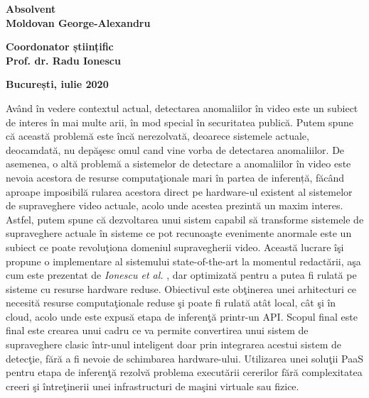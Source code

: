 \documentclass[a4paper,12pt]{report}
\renewenvironment{abstract}[1]
  {\bigskip\selectlanguage{#1}%
   \begin{center}\bfseries\abstractname\end{center}}
  {\par\bigskip}
\begin{document}
\begin{titlepage}
\begin{center}
        \vspace{2.5cm}
        \begin{large}
            \textbf{Absolvent}\\
            \vspace*{0.25cm}
            \textbf{Moldovan George-Alexandru}
        \end{large}
        
        \vspace{2cm}
        \begin{large}
            \textbf{Coordonator științific}\\
            \vspace*{0.25cm}
            \textbf{Prof. dr. Radu Ionescu}
        \end{large}
        
        \vspace{2.5cm}
        \begin{large}
            \textbf{București, iulie 2020}
        \end{large}
    \end{center}
\end{titlepage}
\begin{abstract}{romanian}
\par Având în vedere contextul actual, detectarea anomaliilor în video este un subiect de interes în mai multe arii, în mod special în securitatea publică. Putem spune că această problemă este încă nerezolvată, deoarece sistemele actuale, deocamdată, nu depăşesc  omul cand vine vorba de detectarea anomaliilor. De asemenea, o altă problemă a sistemelor de detectare a anomaliilor în video este nevoia acestora de resurse computaţionale mari în partea de inferență, făcând aproape imposibilă rularea acestora direct pe hardware-ul existent al sistemelor de supraveghere video actuale, acolo unde acestea prezintă un maxim interes. Astfel, putem spune că dezvoltarea unui sistem capabil să transforme sistemele de supraveghere actuale în sisteme ce pot recunoaşte evenimente anormale  este un subiect ce poate revoluţiona domeniul supravegherii video. Această lucrare îşi propune o implementare al sistemului state-of-the-art la momentul redactării, aşa cum este prezentat de \emph{Ionescu et al.} \cite{ionescu2019object}, dar optimizată pentru a putea fi rulată pe sisteme cu resurse hardware reduse. Obiectivul este obţinerea unei arhitecturi ce necesită resurse computaţionale reduse şi poate fi rulată atât local, cât şi în cloud, acolo unde este expusă etapa de inferenţă printr-un API. Scopul final este final este crearea unui cadru ce va permite convertirea unui sistem de supraveghere clasic într-unul inteligent doar prin integrarea acestui sistem de detecţie, fără a fi nevoie de schimbarea hardware-ului. Utilizarea unei soluţii PaaS pentru etapa de inferenţă rezolvă problema executării cererilor fără complexitatea creeri şi întreţinerii unei infrastructuri de maşini virtuale sau fizice. 
\end{abstract}
\end{document}
